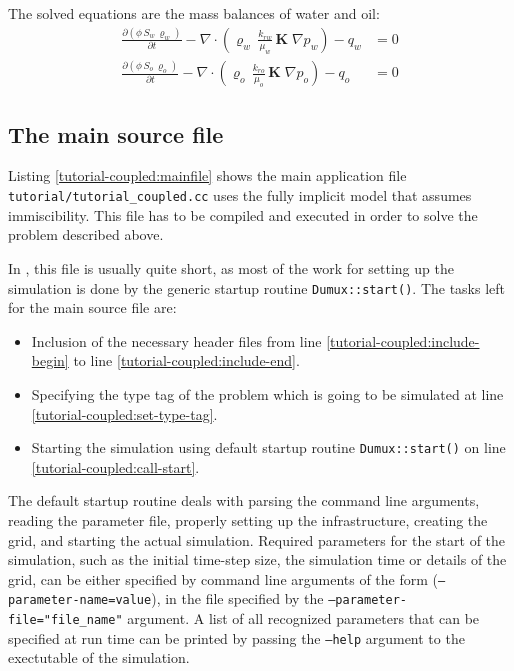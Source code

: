 The solved equations are the mass balances of water and oil:
\begin{align}
  \label{massbalancewater}
  \frac {\partial (\phi \, S_{w}\, \varrho_{w})}{\partial t}
  -
  \nabla \cdot \left( \varrho_{w} \, \frac{k_{rw}}{\mu_{w}} \, \mathbf{K}\;\nabla p_w \right)
  -
  q_w
  & =
  0 \\
  \label{massbalanceoil}
  \frac {\partial (\phi \, S_{o}\, \varrho_{o})}{\partial t}
  -
  \nabla \cdot \left( \varrho_{o} \, \frac{k_{ro}}{\mu_{o}} \, \mathbf{K}\;\nabla p_o \right)
  -
  q_o 
  & =
  0
\end{align}

\subsection{The main source file}

Listing \ref{tutorial-coupled:mainfile} shows the main application
file \texttt{tutorial/tutorial\_coupled.cc} uses the fully implicit
model that assumes immiscibility. This file has to be compiled and
executed in order to solve the problem described above.

\begin{lst}\label{tutorial-coupled:mainfile} \mbox{}
  
\end{lst}

In \eWoms, this file is usually quite short, as most of the work for
setting up the simulation is done by the generic startup routine
\texttt{Dumux::start()}. The tasks left for the main source file are:
\begin{itemize}
\item Inclusion of the necessary header files from line
  \ref{tutorial-coupled:include-begin} to line
  \ref{tutorial-coupled:include-end}.
\item Specifying the type tag of the problem which is going to be
  simulated at line \ref{tutorial-coupled:set-type-tag}.
\item Starting the simulation using default \eWoms startup routine
  \texttt{Dumux::start()} on line \ref{tutorial-coupled:call-start}.
\end{itemize}

The default \eWoms startup routine deals with parsing the command line
arguments, reading the parameter file, properly setting up the \Dune
infrastructure, creating the grid, and starting the actual simulation.
Required parameters for the start of the simulation, such as the
initial time-step size, the simulation time or details of the grid,
can be either specified by command line arguments of the form
(\texttt{--parameter-name=value}), in the file specified by the
\texttt{--parameter-file="file\_name"} argument. A list of all
recognized parameters that can be specified at run time can be printed
by passing the \texttt{--help} argument to the exectutable of the
simulation.

